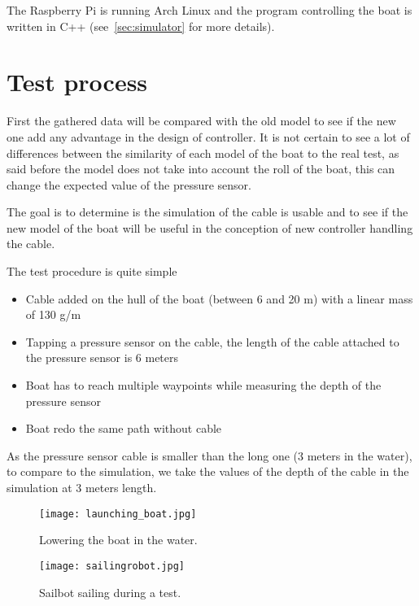 The Raspberry Pi is running Arch Linux and the program controlling the boat is written in C++ (see~\ref{sec:simulator} for more details).

\section{Test process}

First the gathered data will be compared with the old model to see if the new one add any advantage in the design of controller. It is not certain to see a lot of differences between the similarity of each model of the boat to the real test, as said before the model does not take into account the roll of the boat, this can change the expected value of the pressure sensor.

 The goal is to determine is the simulation of the cable is usable and to see if the new model of the boat will be useful in the conception of new controller handling the cable. 
 
 The test procedure is quite simple
 
\begin{itemize}[label=$-$,itemsep=0cm,topsep=0cm]
\item Cable added on the hull of the boat (between 6 and 20 m) with a linear mass of 130 g/m
\item Tapping a pressure sensor on the cable, the length of the cable attached to the pressure sensor is 6 meters
\item Boat has to reach multiple waypoints while measuring the depth of the pressure sensor
\item Boat redo the same path without cable
\end{itemize}

As the pressure sensor cable is smaller than the long one (3 meters in the water), to compare to the simulation, we take the values of the depth of the cable in the simulation at 3 meters length.


\begin{figure}[H]
\centering
    \begin{minipage}[b]{0.4\textwidth}
    \centering
    \texttt{[image: launching\_boat.jpg]}
    \caption{Lowering the boat in the water.}
    \label{fig:lowerboat}
    \end{minipage}
    \hfill
    \begin{minipage}[b]{0.45\textwidth}
    \centering
    \texttt{[image: sailingrobot.jpg]}
    \caption{Sailbot sailing during a test.}
    \label{fig:sailbot_test}
    \end{minipage}
\end{figure}

